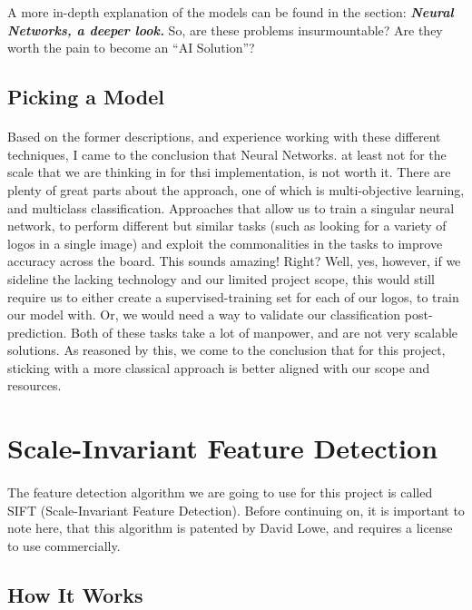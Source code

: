 \documentclass{article}
\begin{document}
A more in-depth explanation of the models can be found in
the section: \textbf{\textit{Neural Networks, a deeper look.}}  So, are these
problems insurmountable? Are they worth the pain to become
an “AI Solution”?

\subsection{Picking a Model}
\paragraph{}
Based on the former descriptions, and experience working
with these different techniques, I came to the conclusion that
Neural Networks. at least not for the scale that we are thinking
in for thsi implementation, is not worth it. There are plenty
of great parts about the approach, one of
which is multi-objective learning, and multiclass
classification. Approaches that allow us to train a
singular neural network, to perform different but similar
tasks (such as looking for a variety of logos in a single
image) and exploit the commonalities in the tasks to improve
accuracy across the board. This sounds amazing! Right? Well,
yes, however, if we sideline the lacking technology and our
limited project scope, this would still require us to either
create a supervised-training set for each of our logos, to
train our model with. Or, we would need a way to validate
our classification post-prediction.  Both of these tasks
take a lot of manpower, and are not very scalable solutions.
As reasoned by this, we come to the conclusion that for this 
project, sticking with a more classical approach is better
aligned with our scope and resources.

\section{Scale-Invariant Feature Detection}
\paragraph{}
The feature detection algorithm we are going to use for this project is called SIFT (Scale-Invariant Feature Detection).  Before continuing on, it is important to note here, that this algorithm is patented by David Lowe, and requires a license to use commercially.   
\subsection{How It Works}
\end{document}
